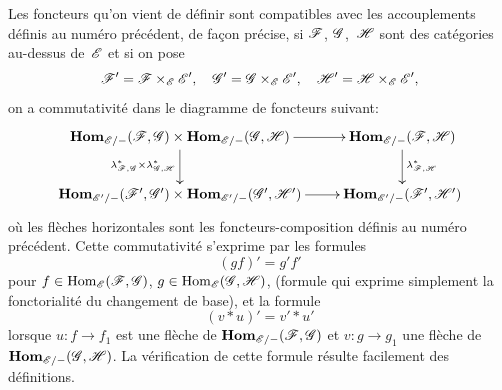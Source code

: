 Les foncteurs qu'on vient de d\'efinir sont compatibles avec les
accouplements d\'efinis au num\'ero pr\'ec\'edent, de fa\c con pr\'ecise, si $\cal{F}$, $\cal{G}$,~$\cal{H}$ sont des
cat\'egories au-dessus de~$\cal{E}$ et si on pose
$$
\cal{F}'=\cal{F}\times_{\cal{E}}\cal{E}'\quoi,\quad \cal{G}'=
\cal{G}\times_{\cal{E}}\cal{E}'\quoi,\quad \cal{H}'=
\cal{H}\times_{\cal{E}}\cal{E}'\quoi,
$$
on a commutativit\'e dans le diagramme de foncteurs suivant:
$$
\xymatrix{{\mathbf{Hom}_{\cal{E}/-}(\cal{F},\cal{G})\times
\mathbf{Hom}_{\cal{E}/-}(\cal{G},\cal{H})}\ar[r]\ar[d]_{\lambda^*_{\cal{F},\cal{G}}\times \lambda^*_{\cal{G},\cal{H}}}&{\mathbf{Hom}_{\cal{E}/-}(\cal{F},\cal{H})}\ar[d]^{\lambda^*_{\cal{F},\cal{H}}}\\{\mathbf{Hom}_{\cal{E}'/-}(\cal{F}',\cal{G}')\times
\mathbf{Hom}_{\cal{E}'/-}(\cal{G}',\cal{H}')}\ar[r]&{\mathbf{Hom}_{\cal{E}'/-}(\cal{F}',\cal{H}')}}
$$
o\`u les fl\`eches horizontales sont les foncteurs-composition
d\'efinis au num\'ero pr\'ec\'edent. Cette commutativit\'e
s'exprime par les formules
$$
(gf)'=g'f'
$$
pour $f\in\Hom_{\cal{E}}(\cal{F},\cal{G})$,
$g\in\Hom_{\cal{E}}(\cal{G},\cal{H})$, (formule qui exprime simplement
la fonctorialit\'e du changement de base), et la formule
$$
(v*u)'=v'*u'
$$
lorsque $u\colon f\to f_1$ est une fl\`eche de
$\SheafHom_{\cal{E}/-}(\cal{F},\cal{G})$ et $v\colon g\to g_1$ une
fl\`eche de~$\SheafHom_{\cal{E}/-}(\cal{G},\cal{H})$. La
v\'erification de cette formule r\'esulte facilement des
d\'efinitions.

